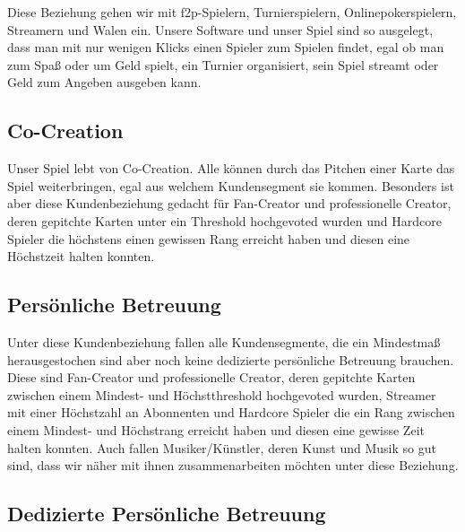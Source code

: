 \documentclass[fontsize=11, a4aper]{scrartcl}
\begin{document}
Diese Beziehung gehen wir mit \ac{f2p}-Spielern, Turnierspielern, Onlinepokerspielern, Streamern und Walen ein. Unsere Software und unser Spiel sind so ausgelegt, dass man mit nur wenigen Klicks einen Spieler zum Spielen findet, egal ob man zum Spaß oder um Geld spielt, ein Turnier organisiert, sein Spiel streamt oder Geld zum Angeben ausgeben kann.

\subsection{Co-Creation} \label{subsec:Kundenbeziehungen:Co_-_Creation}

Unser Spiel lebt von Co-Creation. Alle können durch das Pitchen einer Karte das Spiel weiterbringen, egal aus welchem Kundensegment sie kommen. Besonders ist aber diese Kundenbeziehung gedacht für Fan-Creator und professionelle Creator, deren gepitchte Karten unter ein Threshold hochgevoted wurden und Hardcore Spieler die höchstens einen gewissen Rang erreicht haben und diesen eine Höchstzeit halten konnten.

\subsection{Persönliche Betreuung} \label{subsec:Kundenbeziehung:Persoenliche_Betreuung}

Unter diese Kundenbeziehung fallen alle Kundensegmente, die ein Mindestmaß herausgestochen sind aber noch keine dedizierte persönliche Betreuung brauchen. Diese sind Fan-Creator und professionelle Creator, deren gepitchte Karten zwischen einem Mindest- und Höchstthreshold hochgevoted wurden, Streamer mit einer Höchstzahl an Abonnenten und Hardcore Spieler die ein Rang zwischen einem Mindest- und Höchstrang erreicht haben und diesen eine gewisse Zeit halten konnten. Auch fallen Musiker/Künstler, deren Kunst und Musik so gut sind, dass wir näher mit ihnen zusammenarbeiten möchten unter diese Beziehung.

\subsection{Dedizierte Persönliche Betreuung} \label{subsec:Kundenbeziehungen:Dedizierte_Persönliche_Betreuung}
\end{document}
